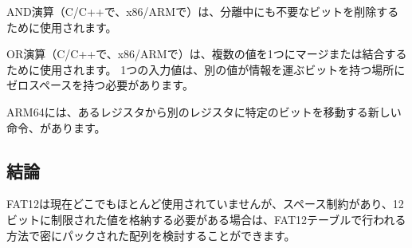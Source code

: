 AND演算（C/C++で\TT{\&}、x86/ARMで）は、分離中にも不要なビットを削除するために使用されます。

OR演算（C/C++で\TT{|}、x86/ARMで）は、複数の値を1つにマージまたは結合するために使用されます。
1つの入力値は、別の値が情報を運ぶビットを持つ場所にゼロスペースを持つ必要があります。

ARM64には、あるレジスタから別のレジスタに特定のビットを移動する新しい命令、があります。

\subsection{結論}

FAT12は現在どこでもほとんど使用されていませんが、スペース制約があり、12ビットに制限された値を格納する必要がある場合は、FAT12テーブルで行われる方法で密にパックされた配列を検討することができます。